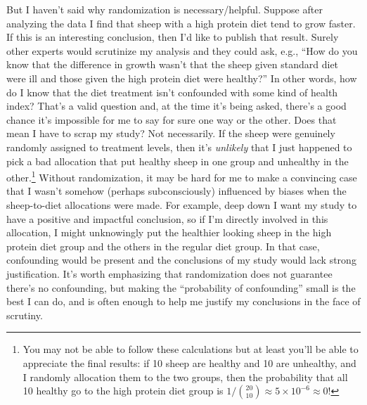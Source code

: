 \documentclass[a4paper, 12pt]{article}
\theoremstyle{plain}
\theoremstyle{definition}
\theoremstyle{remark}
\begin{document}
But I haven't said why randomization is necessary/helpful.  Suppose after analyzing the data I find that sheep with a high protein diet tend to grow faster.  If this is an interesting conclusion, then I'd like to publish that result.  Surely other experts would scrutinize my analysis and they could ask, e.g., ``How do you know that the difference in growth wasn't that the sheep given standard diet were ill and those given the high protein diet were healthy?''  In other words, how do I know that the diet treatment isn't confounded with some kind of health index?  That's a valid question and, at the time it's being asked, there's a good chance it's impossible for me to say for sure one way or the other.  Does that mean I have to scrap my study?  Not necessarily.  If the sheep were genuinely {randomly} assigned to treatment levels, then it's {\em unlikely} that I just happened to pick a bad allocation that put healthy sheep in one group and unhealthy in the other.\footnote{You may not be able to follow these calculations but at least you'll be able to appreciate the final results: if 10 sheep are healthy and 10 are unhealthy, and I randomly allocation them to the two groups, then the probability that all 10 healthy go to the high protein diet group is $1/\binom{20}{10} \approx 5 \times 10^{-6} \approx 0$!}  Without randomization, it may be hard for me to make a convincing case that I wasn't somehow (perhaps subconsciously) influenced by biases when the sheep-to-diet allocations were made.  For example, deep down I want my study to have a positive and impactful conclusion, so if I'm directly involved in this allocation, I might unknowingly put the healthier looking sheep in the high protein diet group and the others in the regular diet group.  In that case, confounding would be present and the conclusions of my study would lack strong justification.  It's worth emphasizing that randomization does not guarantee there's no confounding, but making the ``probability of confounding'' small is the best I can do, and is often enough to help me justify my conclusions in the face of scrutiny.  
\end{document}
